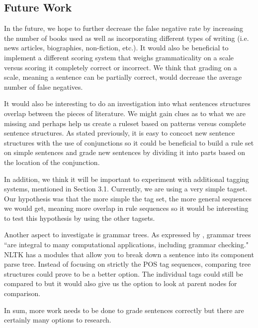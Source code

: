 \documentclass[11pt,a4paper]{article}
\begin{document}
\begin{multicols}{2}
\section{Future Work}
In the future, we hope to further decrease the false negative rate by increasing the number of books used as well as incorporating different types of writing (i.e. news articles, biographies, non-fiction, etc.). It would also be beneficial to implement a different scoring system that weighs grammaticality on a scale versus scoring it completely correct or incorrect. We think that grading on a scale, meaning a sentence can be partially correct, would decrease the average number of false negatives.

It would also be interesting to do an investigation into what sentences structures overlap between the pieces of literature. We might gain clues as to what we are missing and perhaps help us create a ruleset based on patterns versus complete sentence structures. As stated previously, it is easy to concoct new sentence structures with the use of conjunctions so it could be beneficial to build a rule set on simple sentences and grade new sentences by dividing it into parts based on the location of the conjunction.  

In addition, we think it will be important to experiment with additional tagging systems, mentioned in Section 3.1. Currently, we are using a very simple tagset. Our hypothesis was that the more simple the tag set, the more general sequences we would get, meaning more overlap in rule sequences so it would be interesting to test this hypothesis by using the other tagsets. 

Another aspect to investigate is grammar trees. As expressed by \cite{jurafsky}, grammar trees ``are integral to many computational applications, including grammar checking." NLTK has a modules that allow you to break down a sentence into its component parse tree. Instead of focusing on strictly the POS tag sequences, comparing tree structures could prove to be a better option. The individual tags could still be compared to but it would also give us the option to look at parent nodes for comparison.

In sum, more work needs to be done to grade sentences correctly but there are certainly many options to research.

\newpage




\end{multicols}
\end{document}
